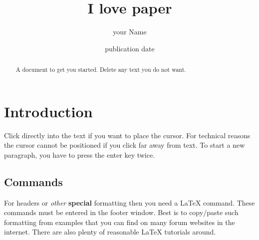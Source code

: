 \documentclass[a4paper, 11pt]{article}
\title{I love paper}
\author{your Name}
\date{publication date}
\begin{document}

\maketitle

\begin{abstract}
A document to get you started. Delete any text you do not want.
\end{abstract}

\section{Introduction}
Click directly into the text if you want to place the cursor. For technical reasons the cursor cannot be positioned if you click far away from text.  To start a new paragraph, you have to press the enter key twice.

\subsection{Commands}

For headers or \emph{other} \textbf{special} formatting then you need a  \LaTeX\xspace command. These commands must be entered in the footer window. Best is to copy/paste such formatting from examples that you can find on many forum websites in the internet. There are also plenty of reasonable  \LaTeX\xspace tutorials around.


\end{document}
